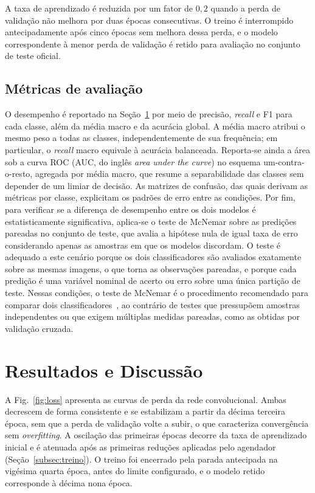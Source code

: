 \documentclass[conference]{IEEEtran}
\begin{document}
A taxa de aprendizado é reduzida por um fator de $0{,}2$ quando a perda de validação não melhora por duas épocas consecutivas. O treino é interrompido antecipadamente após cinco épocas sem melhora dessa perda, e o modelo correspondente à menor perda de validação é retido para avaliação no conjunto de teste oficial.

\subsection{Métricas de avaliação}
\label{subsec:metricas}

O desempenho é reportado na Seção~\ref{sec:resultados} por meio de precisão, \textit{recall} e F1 para cada classe, além da média macro e da acurácia global. A média macro atribui o mesmo peso a todas as classes, independentemente de sua frequência; em particular, o \textit{recall} macro equivale à acurácia balanceada. Reporta-se ainda a área sob a curva ROC (AUC, do inglês \textit{area under the curve}) no esquema um-contra-o-resto, agregada por média macro, que resume a separabilidade das classes sem depender de um limiar de decisão. As matrizes de confusão, das quais derivam as métricas por classe, explicitam os padrões de erro entre as condições. Por fim, para verificar se a diferença de desempenho entre os dois modelos é estatisticamente significativa, aplica-se o teste de McNemar sobre as predições pareadas no conjunto de teste, que avalia a hipótese nula de igual taxa de erro considerando apenas as amostras em que os modelos discordam. O teste é adequado a este cenário porque os dois classificadores são avaliados exatamente sobre as mesmas imagens, o que torna as observações pareadas, e porque cada predição é uma variável nominal de acerto ou erro sobre uma única partição de teste. Nessas condições, o teste de McNemar é o procedimento recomendado para comparar dois classificadores~\cite{dietterich1998}, ao contrário de testes que pressupõem amostras independentes ou que exigem múltiplas medidas pareadas, como as obtidas por validação cruzada.

\section{Resultados e Discussão}
\label{sec:resultados}

A Fig.~\ref{fig:loss} apresenta as curvas de perda da rede convolucional. Ambas decrescem de forma consistente e se estabilizam a partir da décima terceira época, sem que a perda de validação volte a subir, o que caracteriza convergência sem \textit{overfitting}. A oscilação das primeiras épocas decorre da taxa de aprendizado inicial e é atenuada após as primeiras reduções aplicadas pelo agendador (Seção~\ref{subsec:treino}). O treino foi encerrado pela parada antecipada na vigésima quarta época, antes do limite configurado, e o modelo retido corresponde à décima nona época.
\end{document}
